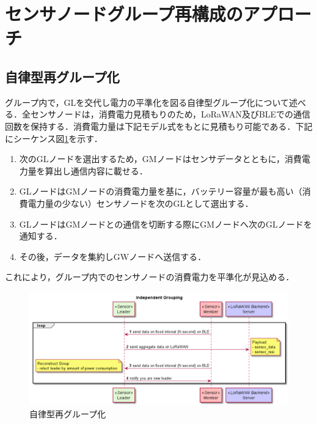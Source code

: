 \section{センサノードグループ再構成のアプローチ}

\subsection{自律型再グループ化}
グループ内で，GLを交代し電力の平準化を図る自律型グループ化について述べる．全センサノードは，消費電力見積もりのため，LoRaWAN及びBLEでの通信回数を保持する．消費電力量は下記モデル式をもとに見積もり可能である．下記にシーケンス図\ref{fig:group_reconstruction_independently}を示す．

\begin{enumerate}
    \item 次のGLノードを選出するため，GMノードはセンサデータとともに，消費電力量を算出し通信内容に載せる．
    \item GLノードはGMノードの消費電力量を基に，バッテリー容量が最も高い（消費電力量の少ない）センサノードを次のGLとして選出する．
    \item GLノードはGMノードとの通信を切断する際にGMノードへ次のGLノードを通知する．
    \item その後，データを集約しGWノードへ送信する．
\end{enumerate}

これにより，グループ内でのセンサノードの消費電力を平準化が見込める．

\begin{figure}[]
    \begin{center}
    \includegraphics[width=14cm]{figures/グループ化_自律的.png}
    \caption{自律型再グループ化}
    \label{fig:group_reconstruction_independently}
    \end{center}
\end{figure}

